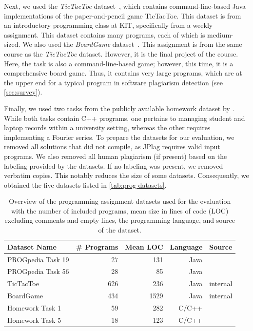 Next, we used the \textit{TicTacToe} dataset~\cite{Saglam2024b}, which contains command-line-based Java implementations of the paper-and-pencil game TicTacToe. 
This dataset is from an introductory programming class at KIT, specifically from a weekly assignment.
This dataset contains many programs, each of which is medium-sized.
We also used the \textit{BoardGame} dataset~\cite{Saglam2024b}. This assignment is from the same course as the \textit{TicTacToe} dataset. However, it is the final project of the course. Here, the task is also a command-line-based game; however, this time, it is a comprehensive board game. Thus, it contains very large programs, which are at the upper end for a typical program in software plagiarism detection (see \autoref{sec:survey}).

Finally, we used two tasks from the publicly available homework dataset by \citet{Ljubovic2020a}.
While both tasks contain C++ programs, one pertains to managing student and laptop records within a university setting, whereas the other requires implementing a Fourier series.
To prepare the datasets for our evaluation, we removed all solutions that did not compile, as JPlag requires valid input programs.
We also removed all human plagiarism (if present) based on the labeling provided by the datasets. If no labeling was present, we removed verbatim copies.
This notably reduces the size of some datasets.
Consequently, we obtained the five datasets listed in \autoref{tab:prog-datasets}.

\begin{table}[b]
    \centering
    \begin{tabular}{lrrrr}
        \toprule
        {Dataset Name} & {\# Programs} & {Mean LOC} & Language & Source \\
        \midrule
        PROGpedia Task 19 & 27 & 131 & Java & \cite{paiva2023}\\
        PROGpedia Task 56 & 28 & 85 & Java & \cite{paiva2023}\\
        TicTacToe & 626 & 236 & Java & \scriptsize{internal}\\
        BoardGame & 434 & 1529 & Java & \scriptsize{internal}\\
        Homework Task 1 & 59 & 282 & C/C++ & \cite{Ljubovic2020a}\\
        Homework Task 5 & 18 & 123 & C/C++ & \cite{Ljubovic2020a}\\
        \bottomrule
    \end{tabular}
    \caption[Evaluation Datasets]{Overview of the programming assignment datasets used for the evaluation with the number of included programs, mean size in lines of code (LOC) excluding comments and empty lines, the programming language, and source of the dataset.}
    \label{tab:prog-datasets}
\end{table}

